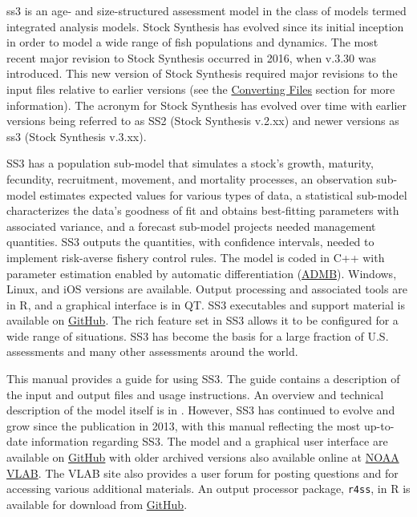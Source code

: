 \gls{ss3} is an age- and size-structured assessment model in the class of models termed integrated analysis models. Stock Synthesis has evolved since its initial inception in order to model a wide range of fish populations and dynamics. The most recent major revision to Stock Synthesis occurred in 2016, when v.3.30 was introduced. This new version of Stock Synthesis required major revisions to the input files relative to earlier versions (see the \hyperlink{ConvIssues}{Converting Files} section for more information). The acronym for Stock Synthesis has evolved over time with earlier versions being referred to as SS2 (Stock Synthesis v.2.xx) and newer versions as \gls{ss3} (Stock Synthesis v.3.xx). 

SS3 has a population sub-model that simulates a stock's growth, maturity, fecundity, recruitment, movement, and mortality processes, an observation sub-model estimates expected values for various types of data, a statistical sub-model characterizes the data's goodness of fit and obtains best-fitting parameters with associated variance, and a forecast sub-model projects needed management quantities. SS3 outputs the quantities, with confidence intervals, needed to implement risk-averse fishery control rules. The model is coded in C++ with parameter estimation enabled by automatic differentiation (\href{http://www.admb-project.org}{ADMB}). Windows, Linux, and iOS versions are available.  Output processing and associated tools are in R, and a graphical interface is in QT. SS3 executables and support material is available on \href{https://github.com/nmfs-ost}{GitHub}. The rich feature set in SS3 allows it to be configured for a wide range of situations. SS3 has become the basis for a large fraction of U.S. assessments and many other assessments around the world.  

This manual provides a guide for using SS3. The guide contains a description of the input and output files and usage instructions. An overview and technical description of the model itself is in \citet{methotstock2013}. However, SS3 has continued to evolve and grow since the publication in 2013, with this manual reflecting the most up-to-date information regarding SS3. The model and a graphical user interface are available on \href{https://github.com/nmfs-ost}{GitHub} with older archived versions also available online at \href{https://vlab.noaa.gov/web/stock-synthesis}{NOAA VLAB}. The VLAB site also provides a user forum for posting questions and for accessing various additional materials. An output processor package, \texttt{r4ss}, in R is available for download from \href{https://github.com/r4ss/r4ss}{GitHub}.

